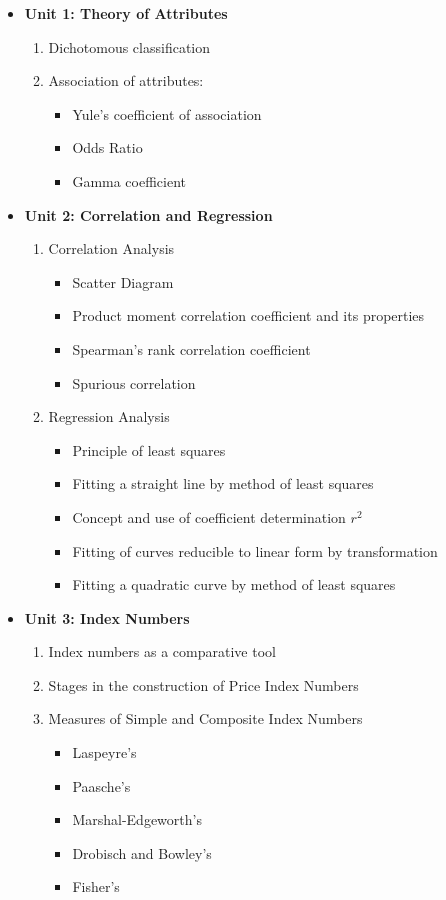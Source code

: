 \documentclass[
10pt, %
a4paper, %
]{report}
\begin{document}
\begin{itemize}
\item[] \textbf{Unit 1: Theory of Attributes}
\begin{enumerate}
\item Dichotomous classification
\item Association of attributes:
\begin{itemize}
\item Yule’s coefficient of association
\item Odds Ratio
\item Gamma coefficient
\end{itemize}
\end{enumerate}
\item[] \textbf{Unit 2: Correlation and Regression}
\begin{enumerate}
\item Correlation Analysis
\begin{itemize}
\item Scatter Diagram
\item Product moment correlation coefficient and its properties
\item Spearman's rank correlation coefficient
\item Spurious correlation
\end{itemize}
\item Regression Analysis
\begin{itemize}
\item Principle of least squares
\item Fitting a straight line by method of least squares
\item Concept and use of coefficient determination \(r^2\)
\item Fitting of curves reducible to linear form by transformation
\item Fitting a quadratic curve by method of least squares
\end{itemize}
\end{enumerate}
\item[] \textbf{Unit 3: Index Numbers}
\begin{enumerate}
\item Index numbers as a comparative tool
\item Stages in the construction of Price Index Numbers
\item Measures of Simple and Composite Index Numbers
\begin{itemize}
\item Laspeyre’s \item Paasche’s \item Marshal-Edgeworth’s \item Drobisch and Bowley’s \item Fisher’s

\end{itemize}
\end{enumerate}
\end{itemize}
\end{document}

